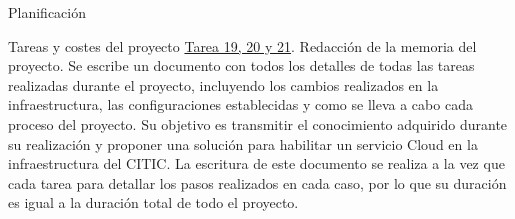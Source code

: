 \begin{chapter}{Planificación}
\begin{section}{Tareas y costes del proyecto}
\underline{Tarea 19, 20 y 21}. Redacción de la memoria del proyecto. Se escribe un documento con todos los detalles de todas las tareas realizadas durante el proyecto, incluyendo los cambios realizados en la infraestructura, las configuraciones establecidas y como se lleva a cabo cada proceso del proyecto. Su objetivo es transmitir el conocimiento adquirido durante su realización y proponer una solución para habilitar un servicio Cloud en la infraestructura del CITIC. La escritura de este documento se realiza a la vez que cada tarea para detallar los pasos realizados en cada caso, por lo que su duración es igual a la duración total de todo el proyecto.\\


\end{section}
\end{chapter}
